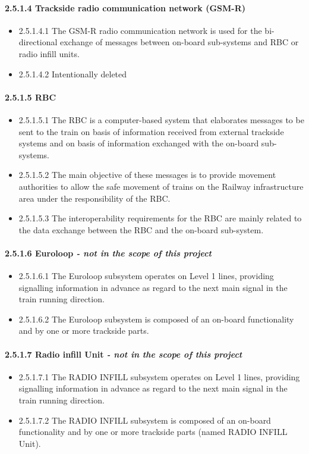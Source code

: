 \paragraph{2.5.1.4 Trackside radio communication network (GSM-R)}
\begin{itemize}
\item 2.5.1.4.1	The GSM-R radio communication network is used for the bi-directional exchange of messages between on-board sub-systems and RBC or radio infill units. 
\item 2.5.1.4.2	Intentionally deleted
\end{itemize}

\paragraph{2.5.1.5 RBC}
\begin{itemize}
\item 2.5.1.5.1	The RBC is a computer-based system that elaborates messages to be sent to the train on basis of information received from external trackside systems and on basis of information exchanged with the on-board sub-systems. 
\item 2.5.1.5.2	The main objective of these messages is to provide movement authorities to allow the safe movement of trains on the Railway infrastructure area under the responsibility of the RBC.
\item 2.5.1.5.3	The interoperability requirements for the RBC are mainly related to the data exchange between the RBC and the on-board sub-system.
\end{itemize}

\paragraph{2.5.1.6 Euroloop \textit{- not in the scope of this project}}
\begin{itemize}
\item 2.5.1.6.1	The Euroloop subsystem operates on Level 1 lines, providing signalling information in advance as regard to the next main signal in the train running direction.
\item 2.5.1.6.2	The Euroloop subsystem is composed of an on-board functionality and by one or more trackside parts. 
\end{itemize}
 
\paragraph{2.5.1.7 Radio infill Unit \textit{- not in the scope of this project}}
\begin{itemize}
\item 2.5.1.7.1	The RADIO INFILL subsystem operates on Level 1 lines, providing signalling information in advance as regard to the next main signal in the train running direction.
\item 2.5.1.7.2	The RADIO INFILL subsystem is composed of an on-board functionality and by one or more trackside parts (named RADIO INFILL Unit).
\end{itemize}
 
